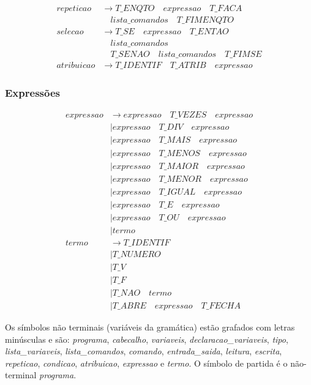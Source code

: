 \documentclass[
  brazilian,
  letterpaper,
]{book}
\theoremstyle{plain}
\theoremstyle{definition}
\theoremstyle{remark}
\begin{document}
\[
\begin{aligned}
repeticao
  &\rightarrow T\_ENQTO \quad expressao \quad T\_FACA \\
  &\quad lista\_comandos \quad T\_FIMENQTO \\[-1pt]
selecao
  &\rightarrow T\_SE \quad expressao \quad T\_ENTAO \\
  &\quad lista\_comandos \\
  &\quad T\_SENAO \quad lista\_comandos \quad T\_FIMSE \\[-1pt]
atribuicao
  &\rightarrow T\_IDENTIF \quad T\_ATRIB \quad expressao
\end{aligned}
\]

\subsubsection{Expressões}\label{expressuxf5es}

\[
\begin{aligned}
expressao
  &\rightarrow expressao \quad T\_VEZES \quad expressao \\
  &\mid expressao \quad T\_DIV \quad expressao \\
  &\mid expressao \quad T\_MAIS \quad expressao \\
  &\mid expressao \quad T\_MENOS \quad expressao \\
  &\mid expressao \quad T\_MAIOR \quad expressao \\
  &\mid expressao \quad T\_MENOR \quad expressao \\
  &\mid expressao \quad T\_IGUAL \quad expressao \\
  &\mid expressao \quad T\_E \quad expressao \\
  &\mid expressao \quad T\_OU \quad expressao \\
  &\mid termo \\[3pt]
termo
  &\rightarrow T\_IDENTIF \\
  &\mid T\_NUMERO \\
  &\mid T\_V \\
  &\mid T\_F \\
  &\mid T\_NAO \quad termo \\
  &\mid T\_ABRE \quad expressao \quad T\_FECHA
\end{aligned}
\]

Os símbolos não terminais (variáveis da gramática) estão grafados com
letras minúsculas e são: \emph{programa}, \emph{cabecalho},
\emph{variaveis}, \emph{declaracao\_variaveis}, \emph{tipo},
\emph{lista\_variaveis}, \emph{lista\_comandos}, \emph{comando},
\emph{entrada\_saida}, \emph{leitura}, \emph{escrita}, \emph{repeticao},
\emph{condicao}, \emph{atribuicao}, \emph{expressao} e \emph{termo}. O
símbolo de partida é o não-terminal \emph{programa}.
\end{document}
